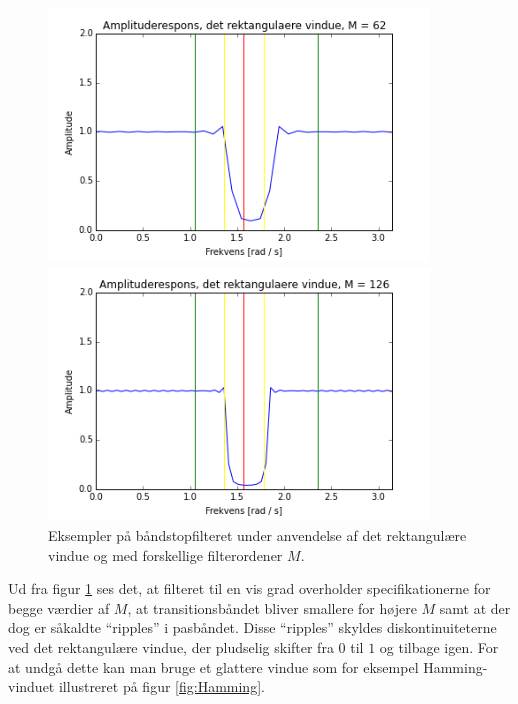 \begin{figure}[H]
\begin{minipage}{0.49\textwidth}
\includegraphics[width=0.9\textwidth]{figures/Filter/Filter_rekt_62.PNG}
\end{minipage}
\begin{minipage}{0.49\textwidth}
\includegraphics[width=0.9\textwidth]{figures/Filter/Filter_rekt_126.PNG}
\end{minipage}
\caption{Eksempler på båndstopfilteret under anvendelse af det rektangulære vindue og med forskellige filterordener $M$.}
\label{fig:filter_rekt}
\end{figure}

Ud fra figur \ref{fig:filter_rekt} ses det, at filteret til en vis grad overholder specifikationerne for begge værdier af $M$, at transitionsbåndet bliver smallere for højere $M$ samt at der dog er såkaldte ``ripples'' i pasbåndet. Disse ``ripples'' skyldes diskontinuiteterne ved det rektangulære vindue, der pludselig skifter fra $0$ til $1$ og tilbage igen. For at undgå dette kan man bruge et glattere vindue som for eksempel Hamming-vinduet illustreret på figur \ref{fig:Hamming}.